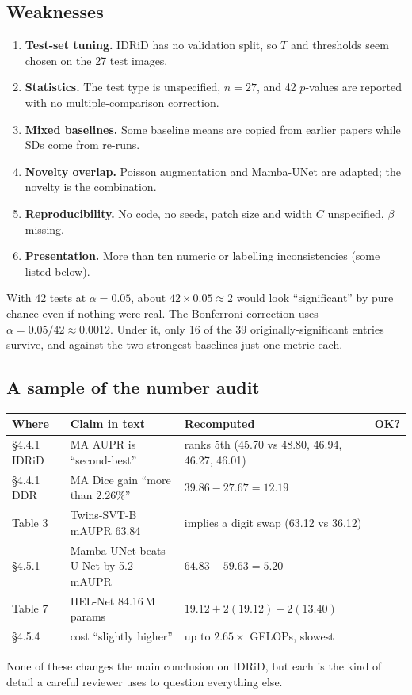 \documentclass[11pt,a4paper]{article}
\newcommand{\cmark}{\textcolor{okgreen}{\ding{51}}}
\newcommand{\xmark}{\textcolor{badred}{\ding{55}}}
\begin{document}
\subsection{Weaknesses}
\begin{enumerate}
\item \textbf{Test-set tuning.} IDRiD has no validation split, so $T$ and thresholds seem chosen on the
      27 test images.
\item \textbf{Statistics.} The test type is unspecified, $n=27$, and 42 $p$-values are reported with no
      multiple-comparison correction.
\item \textbf{Mixed baselines.} Some baseline means are copied from earlier papers while SDs come from
      re-runs.
\item \textbf{Novelty overlap.} Poisson augmentation and Mamba-UNet are adapted; the novelty is the
      combination.
\item \textbf{Reproducibility.} No code, no seeds, patch size and width $C$ unspecified, $\beta$ missing.
\item \textbf{Presentation.} More than ten numeric or labelling inconsistencies (some listed below).
\end{enumerate}

\begin{worked}
With $42$ tests at $\alpha=0.05$, about $42\times0.05\approx2$ would look ``significant'' by pure chance
even if nothing were real. The Bonferroni correction uses $\alpha=0.05/42\approx0.0012$. Under it,
only 16 of the 39 originally-significant entries survive, and against the two strongest baselines
just one metric each.
\end{worked}

\subsection{A sample of the number audit}
\begin{center}
\small
\begin{tabularx}{\linewidth}{@{}l X X c@{}}
\toprule
Where & Claim in text & Recomputed & OK?\\
\midrule
\S4.4.1 IDRiD & MA AUPR is ``second-best'' & ranks 5th (45.70 vs 48.80, 46.94, 46.27, 46.01) & \xmark\\
\S4.4.1 DDR & MA Dice gain ``more than 2.26\%'' & $39.86-27.67=12.19$ & \xmark\\
Table 3 & Twins-SVT-B mAUPR 63.84 & implies a digit swap (63.12 vs 36.12) & \xmark\\
\S4.5.1 & Mamba-UNet beats U-Net by 5.2 mAUPR & $64.83-59.63=5.20$ & \cmark\\
Table 7 & HEL-Net 84.16\,M params & $19.12+2(19.12)+2(13.40)$ & \cmark\\
\S4.5.4 & cost ``slightly higher'' & up to $2.65\times$ GFLOPs, slowest & \xmark\\
\bottomrule
\end{tabularx}
\end{center}
None of these changes the main conclusion on IDRiD, but each is the kind of detail a careful reviewer
uses to question everything else.
\end{document}
